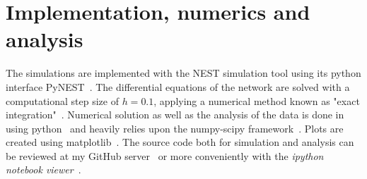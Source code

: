 \FloatBarrier
\section{Implementation, numerics and analysis}
\label{subsec:analysis}
The simulations are implemented with the NEST simulation tool using its python interface
PyNEST~\cite{NEST}. The differential equations of the network are solved with a computational 
step size of $h=0.1$, applying a numerical method known as "exact integration"~\cite{rotter1999exact}.
Numerical solution as well as the analysis of the data is done in using 
python~\cite{python} and heavily relies upon the numpy-scipy framework~\cite{scipy}. 
Plots are created using matplotlib~\cite{matplotlib}.
The source code both for simulation and analysis can be reviewed at my
GitHub server~\cite{ba_github} or more conveniently with the 
\textit{ipython notebook viewer}~\cite{notebook_viewer}.

